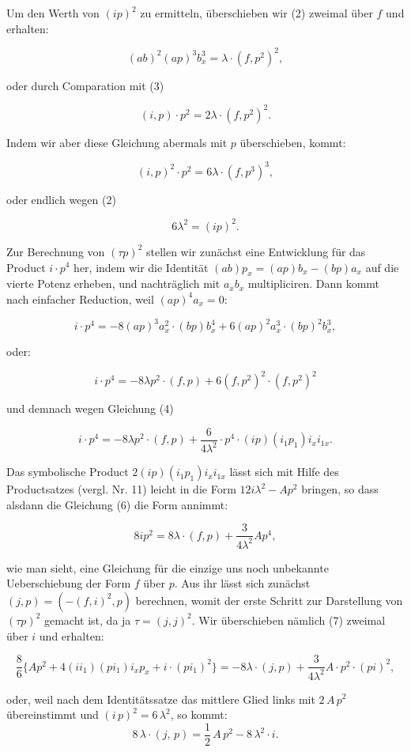 \documentclass[11pt]{article}
\providecommand{\weberpage}[1]{}
\providecommand{\weq}[2]{\begin{equation}\tag{#1}#2\end{equation}}
\begin{document}
Um den Werth von $(ip)^2$ zu ermitteln, überschieben wir (2) zweimal
über $f$ und erhalten:

\[ (ab)^2(ap)^3b_x^3 = \lambda\cdot(f,p^2)^2, \]

oder durch Comparation mit (3)

\weq{4}{(i,p)\cdot p^2=2\lambda\cdot(f,p^2)^2.}

Indem wir aber diese Gleichung abermals mit $p$ überschieben,
kommt:

\[ (i,p)^2\cdot p^2 = 6\lambda\cdot(f,p^3)^3, \]

oder endlich wegen (2)

\weq{5}{6\lambda^2=(ip)^2.}

Zur Berechnung von $(\tau p)^2$ stellen wir zunächst eine Entwicklung für
das Product $i\cdot p^4$ her, indem wir die Identität $(ab)p_x=(ap)b_x-(bp)a_x$
auf die vierte Potenz erheben, und nachträglich mit $a_xb_x$ multipliciren.
Dann kommt nach einfacher Reduction, weil $(ap)^4a_x=0$:

\[ i\cdot p^4 = -8(ap)^3a_x^2\cdot(bp)b_x^4+6(ap)^2a_x^3\cdot(bp)^2b_x^3, \]

oder:

\[ i\cdot p^4 = -8\lambda p^2\cdot(f,p)+6(f,p^2)^2\cdot(f,p^2)^2 \]

und demnach wegen Gleichung (4)

\weq{6}{i\cdot p^4 = -8\lambda p^2\cdot(f,p)+\frac{6}{4\lambda^2}\cdot p^4\cdot(ip)(i_1p_1)i_xi_{1x}.}

Das symbolische Product $2(ip)(i_1p_1)i_xi_{1x}$ lässt sich mit Hilfe des
Productsatzes (vergl. Nr. 11) leicht in die Form $12i\lambda^2-Ap^2$ bringen,
so dass alsdann die Gleichung (6) die Form annimmt:

\weq{7}{8ip^2 = 8\lambda\cdot(f,p)+\frac{3}{4\lambda^2}Ap^4,}

wie man sieht, eine Gleichung für die einzige uns noch unbekannte
Ueberschiebung der Form $f$ über $p$. Aus ihr lässt sich zunächst
$(j,p)=(-(f,i)^2,p)$ berechnen, womit der erste Schritt zur Darstellung
 von $(\tau p)^2$ gemacht ist, da ja $\tau=(j,j)^2$. Wir überschieben
nämlich (7) zweimal über $i$ und erhalten:

\[ \frac{8}{6}\{Ap^2+4(ii_1)(pi_1)i_xp_x+i\cdot(pi_1)^2\} = -8\lambda\cdot(j,p)+\frac{3}{4\lambda^2}A\cdot p^2\cdot(pi)^2, \]


\weberpage{269}
oder, weil nach dem Identit\"atssatze das mittlere Glied links mit $2\,A\,p^2$ \"ubereinstimmt und $(i\,p)^2 = 6\,\lambda^2$, so kommt:
\weq{8}{8\,\lambda\cdot(j,\,p) = \frac{1}{2}\,A\,p^2 - 8\,\lambda^2\cdot i.}
\end{document}
